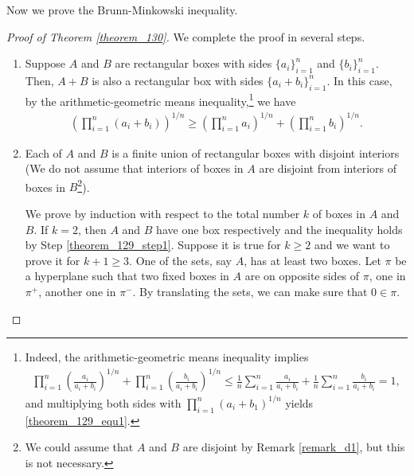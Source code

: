 \medskip

Now we prove the Brunn-Minkowski inequality.

\medskip

\begin{proof}[Proof of Theorem \ref{theorem_130}]
We complete the proof in several steps.
\begin{enumerate}[label=(\Roman*)]
    \item Suppose $A$ and $B$ are rectangular boxes with sides $\{a_i\}^n_{i=1}$ and $\{b_i\}^n_{i=1}$. Then, $A + B$ is also a rectangular box with sides $\{a_i + b_i\}^n_{i=1}$. In this case, by the arithmetic-geometric means inequality,\footnote{Indeed, the arithmetic-geometric means inequality implies 
    \begin{align*}
        \prod_{i=1}^n \left(\frac{a_i}{a_i + b_i}\right)^{1/n} + \prod_{i=1}^n \left(\frac{b_i}{a_i + b_i}\right)^{1/n} \leq \frac{1}{n} \sum^n_{i=1} \frac{a_i}{a_i + b_i} + \frac{1}{n} \sum^n_{i=1} \frac{b_i}{a_i + b_i} = 1,
    \end{align*} 
    and multiplying both sides with $\prod^n_{i=1}(a_i + b_1)^{1/n}$ yields \eqref{theorem_129_equ1}.} we have
    \begin{align}\label{theorem_129_equ1}
        \left(\prod^n_{i=1}(a_i + b_i)\right)^{1/n} \geq \left(\prod^n_{i=1} a_i\right)^{1/n} + \left(\prod^n_{i=1} b_i\right)^{1/n}.
    \end{align}\label{theorem_129_step1}
    
    
    \item  Each of $A$ and $B$ is a finite union of rectangular boxes with disjoint interiors (We do not assume that interiors of boxes in $A$ are disjoint from interiors of boxes in $B$\footnote{We could assume that $A$ and $B$ are disjoint by Remark \ref{remark_d1}, but this is not necessary.}). 
    
    We prove by induction with respect to the total number $k$ of boxes in $A$ and $B$. If $k = 2$, then $A$ and $B$ have one box respectively and the inequality holds by Step \ref{theorem_129_step1}. Suppose it is true for $k \geq 2$ and we want to prove it for $k + 1 \geq 3$. One of the sets, say $A$, has at least two boxes. Let $\pi$ be a hyperplane such that two fixed boxes in $A$ are on opposite sides of $\pi$, one in $\pi^+$, another one in $\pi^-$. By translating the sets, we can make sure that $0 \in \pi$. 
    

\end{enumerate}
\end{proof}
